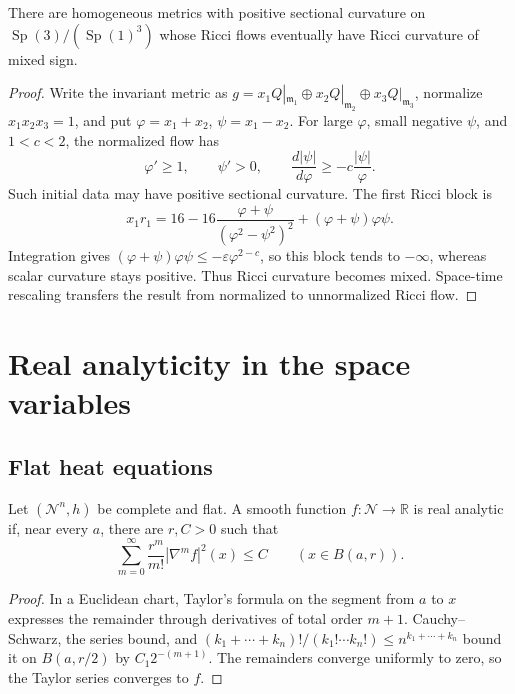\begin{theorem}
\label{thm:chow-ii-bohm-wilking-ricci-sign-counterexample}
There are homogeneous metrics with positive sectional curvature on
\(\operatorname{Sp}(3)/(\operatorname{Sp}(1)^3)\) whose Ricci flows
eventually have Ricci curvature of mixed sign.
\end{theorem}
\begin{proof}
\sketch
Write the invariant metric as \(g=x_1Q|_{\mathfrak m_1}\oplus
x_2Q|_{\mathfrak m_2}\oplus x_3Q|_{\mathfrak m_3}\), normalize
\(x_1x_2x_3=1\), and put \(\varphi=x_1+x_2\), \(\psi=x_1-x_2\).  For large
\(\varphi\), small negative \(\psi\), and \(1<c<2\), the normalized flow has
\[
 \varphi'\geq1,\qquad\psi'>0,\qquad
 \frac{d|\psi|}{d\varphi}\geq-c\frac{|\psi|}{\varphi}.
\]
Such initial data may have positive sectional curvature.  The first Ricci
block is
\[
 x_1r_1=16-16\frac{\varphi+\psi}{(\varphi^2-\psi^2)^2}
 +(\varphi+\psi)\varphi\psi.
\]
Integration gives
\((\varphi+\psi)\varphi\psi\leq-\varepsilon\varphi^{2-c}\), so this block
tends to \(-\infty\), whereas scalar curvature stays positive.  Thus Ricci
curvature becomes mixed.  Space-time rescaling transfers the result from
normalized to unnormalized Ricci flow.
\end{proof}

\section{Real analyticity in the space variables}

\subsection{Flat heat equations}

\begin{example}
\label{ex:chow-ii-flat-factorial-analyticity-criterion}
Let \((\mathcal N^n,h)\) be complete and flat.  A smooth function
\(f:\mathcal N\to\mathbb R\) is real analytic if, near every \(a\), there
are \(r,C>0\) such that
\[
 \sum_{m=0}^{\infty}\frac{r^m}{m!}|\nabla^mf|^2(x)\leq C
 \qquad(x\in B(a,r)).
\]
\end{example}
\begin{proof}
\sketch
In a Euclidean chart, Taylor's formula on the segment from \(a\) to \(x\)
expresses the remainder through derivatives of total order \(m+1\).
Cauchy--Schwarz, the series bound, and
\((k_1+\cdots+k_n)!/(k_1!\cdots k_n!)\leq n^{k_1+\cdots+k_n}\) bound it on
\(B(a,r/2)\) by \(C_1 2^{-(m+1)}\).  The remainders converge uniformly to
zero, so the Taylor series converges to \(f\).
\end{proof}

